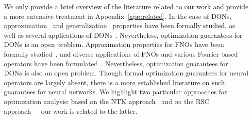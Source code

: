 
We only provide a brief overview of the literature related to our work and provide a more extensive treatment in Appendix~\ref{app:related}. In the case of DONs, approximation~\citep{lu20201DeepONet} and generalization~\citep{kontolati2022_Over_parameterization} properties have been formally studied, as well as several applications of DONs~\citep{goswami_physics-informed_2022,wang_long-time_2021,diab2024u,centofanti2024learning,sun2023deepgraphonet}. Nevertheless, optimization guarantees for DONs is an open problem.
Approximation properties for FNOs have been formally studied~\citep{kovachki2021universal}, and diverse applications of FNOs and various Fourier-based operators have been formulated~\citep{li_multipole_2020,liu_learning-based_2022,wen_u-fnoenhanced_2022,pathak_fourcastnet_2022,centofanti2024learning,li2023fourier,yang2023fourier,harder2023hard}. Nevertheless, optimization guarantees for DONs is also an open problem. 
%
Though formal optimization guarantees for neural operators are largely absent, there is a more established literature on such guarantees for neural networks. We highlight two particular approaches for optimization analysis: based on the NTK approach~\citep{jacot2018neural,liu_linearity_2021,banerjee23a,du2019gradient,allen-zhu_convergence_2019} and on the RSC approach~\citep{banerjee2022restricted,cisnerosvelarde2024optgenWeightNorm}---our work is related to the latter.